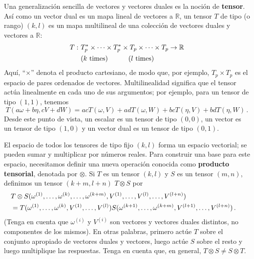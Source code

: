 \documentclass[11pt,b5paper,openany,twoside]{book}
\begin{document}
Una generalización sencilla de vectores y vectores duales es la noción de {\bf tensor}.
Así como un vector dual es un mapa lineal de vectores a $\mathbb{R}$, un tensor $T$ de tipo (o rango) $(k,l)$ es un mapa multilineal de una colección de vectores duales y vectores a $\mathbb{R}$:
\begin{align}
T:~ &T^*_p\times\cdots\times T^*_p\times T_p\times\cdots
\times T_p \rightarrow \mathbb{R}\nonumber \\
& (k~{\rm times})\qquad\quad (l~{\rm times}) \label{1.44}
\end{align}
Aquí, ``$\times$'' denota el producto cartesiano, de modo que, por ejemplo, $T_p\times T_p$ es el espacio de pares ordenados de vectores.
Multilinealidad significa que el tensor actúa linealmente en cada uno de sus argumentos; por ejemplo, para un tensor de tipo $(1,1)$, tenemos
\begin{equation}
T(a\omega+b\eta, cV+dW) = acT(\omega,V)+adT(\omega,W)+bcT(\eta,V)
+bdT(\eta,W)\,.\label{1.45}
\end{equation}
Desde este punto de vista, un escalar es un tensor de tipo $(0,0)$, un vector es un tensor de tipo $(1,0)$ y un vector dual es un tensor de tipo $(0,1)$.

El espacio de todos los tensores de tipo fijo $(k,l)$ forma un espacio vectorial; se pueden sumar y multiplicar por números reales.
Para construir una base para este espacio, necesitamos definir una nueva operación conocida como {\bf producto tensorial}, denotada por $\otimes$.
Si $T$ es un tensor $(k,l)$ y $S$ es un tensor $(m,n)$, definimos un tensor $(k+m,l+n)$ $T\otimes S$ por
\begin{align}
\lefteqn{T\otimes S(\omega^{(1)},\ldots ,\omega^{(k)},\ldots
,\omega^{(k+m)},V^{(1)},\ldots ,V^{(l)},\ldots ,V^{(l+n)})} \nonumber \\
& =
T(\omega^{(1)},\ldots ,\omega^{(k)},V^{(1)},\ldots ,V^{(l)})
S(\omega^{(k+1)},\ldots ,\omega^{(k+m)},V^{(l+1)},\ldots ,V^{(l+n)})
\,.\label{1.46}
\end{align}
(Tenga en cuenta que $\omega^{(i)}$ y $V^{(i)}$ son vectores y vectores duales distintos, no componentes de los mismos).
En otras palabras, primero actúe $T$ sobre el conjunto apropiado de vectores duales y vectores, luego actúe $S$ sobre el resto y luego multiplique las respuestas.
Tenga en cuenta que, en general, $T\otimes S \neq S\otimes T$.
\end{document}

